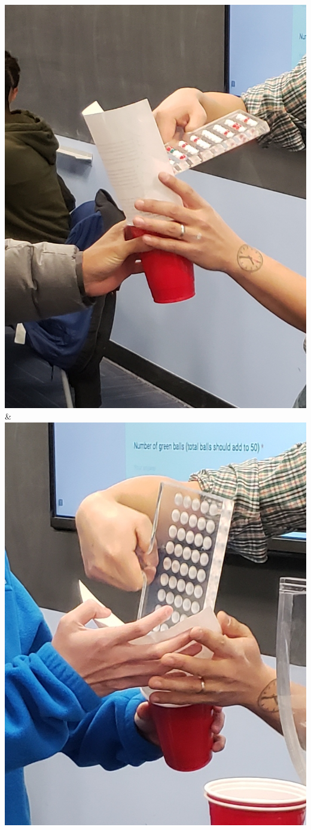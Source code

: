 \documentclass[
  letterpaper,
  DIV=11,
  numbers=noendperiod]{scrreprt}
\theoremstyle{definition}
\theoremstyle{remark}
\begin{document}
\begin{longtable}[]
\includegraphics{images/sampling/tactile_2_b.jpg} &
\includegraphics{images/sampling/tactile_2_c.jpg} \\

\end{longtable}
\end{document}
